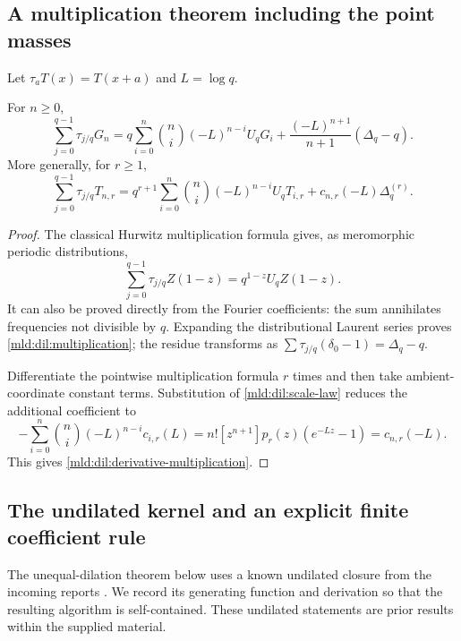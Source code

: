 \subsection{A multiplication theorem including the point masses}
Let $\tau_aT(x)=T(x+a)$ and $L=\log q$.
\begin{theorem}
For $n\ge0$,
\begin{equation}
 \sum_{j=0}^{q-1}\tau_{j/q}G_n
 =q\sum_{i=0}^n\binom ni(-L)^{n-i}U_qG_i
     +\frac{(-L)^{n+1}}{n+1}(\Delta_q-q).
 \label{mld:dil:multiplication}
\end{equation}
More generally, for $r\ge1$,
\begin{equation}
 \sum_{j=0}^{q-1}\tau_{j/q}T_{n,r}
 =q^{r+1}\sum_{i=0}^n\binom ni(-L)^{n-i}U_qT_{i,r}
                  +c_{n,r}(-L)\Delta_q^{(r)}.
 \label{mld:dil:derivative-multiplication}
\end{equation}
\end{theorem}
\begin{proof}
The classical Hurwitz multiplication formula gives, as meromorphic
periodic distributions,
\[
 \sum_{j=0}^{q-1}\tau_{j/q}Z(1-z)
                  =q^{1-z}U_qZ(1-z).
\]
It can also be proved directly from the Fourier coefficients: the
sum annihilates frequencies not divisible by $q$.  Expanding the
distributional Laurent series proves \eqref{mld:dil:multiplication}; the
residue transforms as $\sum\tau_{j/q}(\delta_0-1)=\Delta_q-q$.

Differentiate the pointwise multiplication formula $r$ times and then
take ambient-coordinate constant terms.  Substitution of
\eqref{mld:dil:scale-law} reduces the additional coefficient to
\[
 -\sum_{i=0}^n\binom ni(-L)^{n-i}c_{i,r}(L)
 =n![z^{n+1}]p_r(z)(e^{-Lz}-1)=c_{n,r}(-L).
\]
This gives \eqref{mld:dil:derivative-multiplication}.
\end{proof}

\subsection{The undilated kernel and an explicit finite coefficient rule}
\label{mld:dil:undilated-algorithm}

The unequal-dilation theorem below uses a known undilated closure from
the incoming reports \cite{IncomingClosure,IncomingShifted}. We record its
generating function and derivation so that the resulting algorithm is
self-contained. These undilated statements are prior results within the
supplied material.

